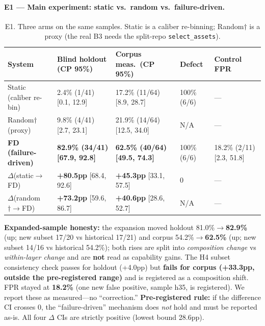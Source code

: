 \documentclass{article}
\begin{document}
\paragraph{E1 --- Main experiment: static vs.\ random vs.\ failure-driven.}
\begin{table}[t]
\caption{E1. Three arms on the same samples. Static is a caliber re-binning; Random$\dagger$ is a
proxy (the real B3 needs the split-repo \texttt{select\_assets}).}
\label{tab:e1}
\centering
\footnotesize
\begin{tabular}{@{}lp{2.7cm}p{2.4cm}p{1.7cm}p{1.5cm}@{}}
\toprule
System & Blind holdout (CP 95\%) & Corpus meas.\ (CP 95\%) & Defect & Control FPR \\
\midrule
Static (caliber re-bin) & 2.4\% (1/41) [0.1, 12.9] & 17.2\% (11/64) [8.9, 28.7] & 100\% (6/6) & --- \\
Random$\dagger$ (proxy) & 9.8\% (4/41) [2.7, 23.1] & 21.9\% (14/64) [12.5, 34.0] & N/A & --- \\
\textbf{FD (failure-driven)} & \textbf{82.9\% (34/41) [67.9, 92.8]} & \textbf{62.5\% (40/64) [49.5, 74.3]} & 100\% (6/6) & 18.2\% (2/11) [2.3, 51.8] \\
$\Delta$(static$\to$FD) & \textbf{+80.5pp} [68.4, 92.6] & \textbf{+45.3pp} [33.1, 57.5] & 0 & --- \\
$\Delta$(random$\dagger\to$FD) & \textbf{+73.2pp} [59.6, 86.7] & \textbf{+40.6pp} [28.6, 52.7] & N/A & --- \\
\bottomrule
\end{tabular}
\end{table}
\textbf{Expanded-sample honesty:} the expansion moved holdout 81.0\%$\to$\textbf{82.9\%} (up;
new subset 17/20 vs historical 17/21) and corpus 54.2\%$\to$\textbf{62.5\%} (up; new subset
14/16 vs historical 54.2\%); both rises are split into \emph{composition change} vs
\emph{within-layer change} and are \textbf{not} read as capability gains. The H4 subset
consistency check passes for holdout (+4.0pp) but \textbf{fails for corpus (+33.3pp, outside the
pre-registered range)} and is registered as a composition shift. FPR stayed at \textbf{18.2\%} (one new false
positive, sample h35, is registered). We report these as measured---no ``correction.''
\textbf{Pre-registered rule:} if the difference CI crosses 0, the ``failure-driven'' mechanism
does \emph{not} hold and must be reported as-is. All four $\Delta$ CIs are strictly positive
(lowest bound 28.6pp).
\end{document}
